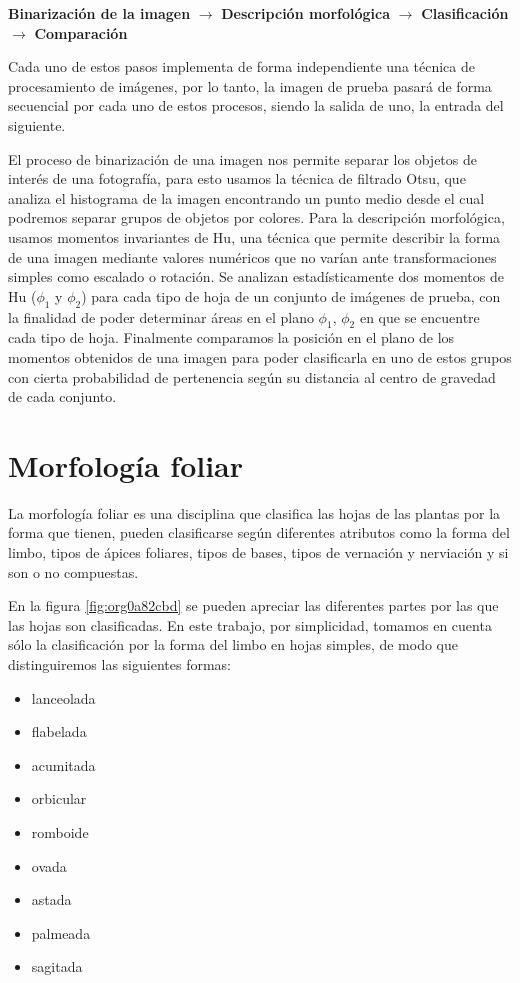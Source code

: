 \documentclass[letter]{article}
\begin{document}
\begin{center}
\textbf{Binarización de la imagen} \(\rightarrow\) \textbf{Descripción morfológica} \(\rightarrow\)
 \textbf{Clasificación} \(\rightarrow\) \textbf{Comparación}
\end{center}

Cada uno de estos pasos implementa de forma independiente una técnica de
procesamiento de imágenes, por lo tanto, la imagen de prueba pasará de forma
secuencial por cada uno de estos procesos, siendo la salida de uno, la entrada
del siguiente.

El proceso de binarización de una imagen nos permite separar los objetos de
interés de una fotografía, para esto usamos la técnica de filtrado Otsu, que
analiza el histograma de la imagen encontrando un punto medio desde el cual
podremos separar grupos de objetos por colores. Para la descripción morfológica,
usamos momentos invariantes de Hu, una técnica que permite describir la forma de
una imagen mediante valores numéricos que no varían ante transformaciones
simples como escalado o rotación. Se analizan estadísticamente dos momentos de
Hu (\(\phi_1\) y \(\phi_2\)) para cada tipo de hoja de un conjunto de imágenes de
prueba, con la finalidad de poder determinar áreas en el plano \(\phi_1\), \(\phi_2\)
en que se encuentre cada tipo de hoja. Finalmente comparamos la posición en el
plano de los momentos obtenidos de una imagen para poder clasificarla en uno de
estos grupos con cierta probabilidad de pertenencia según su distancia al
centro de gravedad de cada conjunto.

\section{Morfología foliar}
\label{sec:orgfe5449a}
La morfología foliar es una disciplina que clasifica las hojas de las plantas
por la forma que tienen, pueden clasificarse según diferentes atributos como la
forma del limbo, tipos de ápices foliares, tipos de bases, tipos de vernación y
nerviación y si son o no compuestas.

En la figura \ref{fig:org0a82cbd} se pueden apreciar las diferentes partes por las que las
hojas son clasificadas. En este trabajo, por simplicidad, tomamos en cuenta sólo
la clasificación por la forma del limbo en hojas simples, de modo que
distinguiremos las siguientes formas:

\begin{itemize}
\item lanceolada
\item flabelada
\item acumitada
\item orbicular
\item romboide
\item ovada
\item astada
\item palmeada
\item sagitada
\end{itemize}
\end{document}
